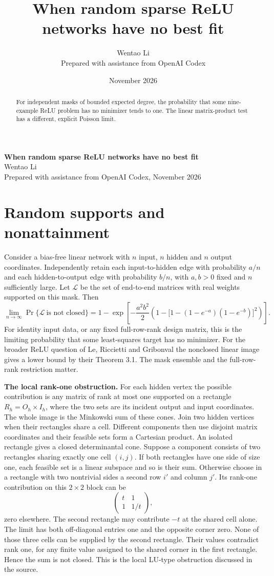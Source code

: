 \documentclass[10pt]{article}
\title{When random sparse ReLU networks have no best fit}
\author{Wentao Li\\{\small Prepared with assistance from OpenAI Codex}}
\date{November 2026}
\begin{document}
\begin{center}{\Large\bfseries When random sparse ReLU networks have no best fit}\\[3pt]Wentao Li\\{\small Prepared with assistance from OpenAI Codex, November 2026}\end{center}
\begin{abstract}
For independent masks of bounded expected degree, the probability that some nine-example ReLU problem has no minimizer tends to one. The linear matrix-product test has a different, explicit Poisson limit.
\end{abstract}
\section*{Random supports and nonattainment}
Consider a bias-free linear network with $n$ input, $n$ hidden and $n$ output coordinates. Independently retain each input-to-hidden edge with probability $a/n$ and each hidden-to-output edge with probability $b/n$, with $a,b>0$ fixed and $n$ sufficiently large. Let $\mathcal L$ be the set of end-to-end matrices with real weights supported on this mask. Then
\[
 \lim_{n\to\infty}\Pr\{\mathcal L\ \text{is not closed}\}
 =1-\exp\left[-\frac{a^2b^2}{2}
 \left(1-\big[1-(1-e^{-a})(1-e^{-b})\big]^2\right)\right].
\]
For identity input data, or any fixed full-row-rank design matrix, this is the limiting probability that some least-squares target has no minimizer. For the broader ReLU question of Le, Riccietti and Gribonval the nonclosed linear image gives a lower bound by their Theorem 3.1. The mask ensemble and the full-row-rank restriction matter.

\textbf{The local rank-one obstruction.} For each hidden vertex the possible contribution is any matrix of rank at most one supported on a rectangle $R_h=O_h\times I_h$, where the two sets are its incident output and input coordinates. The whole image is the Minkowski sum of these cones. Join two hidden vertices when their rectangles share a cell. Different components then use disjoint matrix coordinates and their feasible sets form a Cartesian product. An isolated rectangle gives a closed determinantal cone. Suppose a component consists of two rectangles sharing exactly one cell $(i,j)$. If both rectangles have one side of size one, each feasible set is a linear subspace and so is their sum. Otherwise choose in a rectangle with two nontrivial sides a second row $i'$ and column $j'$. Its rank-one contribution on this $2\times2$ block can be
\[
 \begin{pmatrix}t&1\\1&1/t\end{pmatrix},
\]
zero elsewhere. The second rectangle may contribute $-t$ at the shared cell alone. The limit has both off-diagonal entries one and the opposite corner zero. None of those three cells can be supplied by the second rectangle. Their values contradict rank one, for any finite value assigned to the shared corner in the first rectangle. Hence the sum is not closed. This is the local LU-type obstruction discussed in the source.
\end{document}

